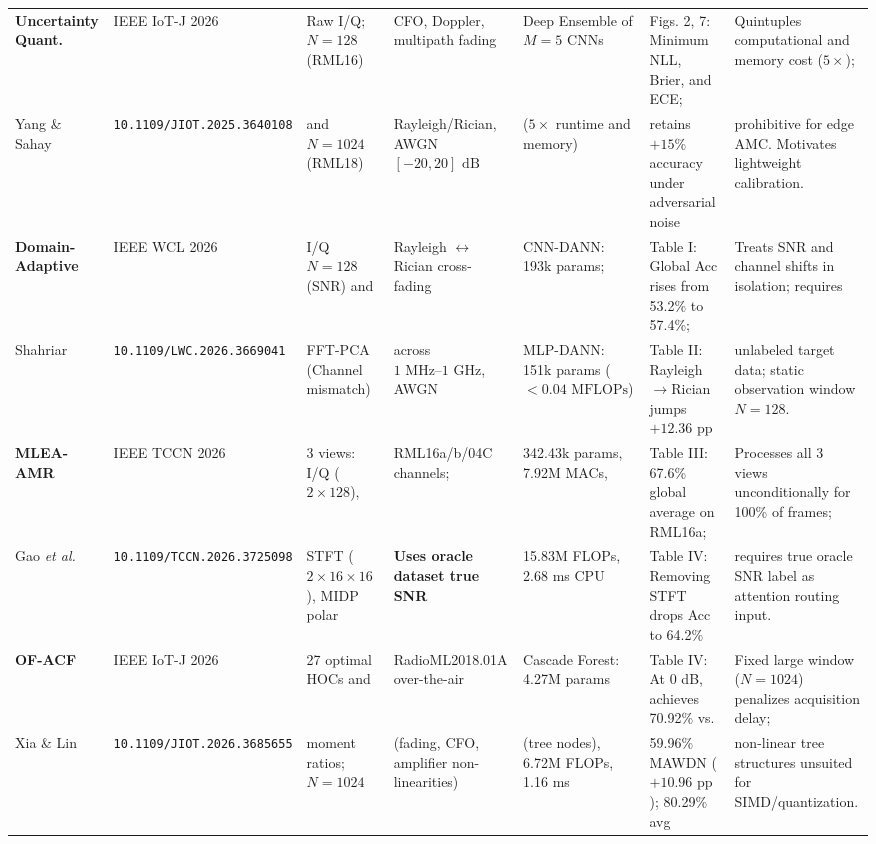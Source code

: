 \begin{table}[!t]
{\begin{tabular}{|l|l|l|l|l|l|l|}
\textbf{Uncertainty Quant.}~\cite{yang2026uncertainty} & 
IEEE IoT-J 2026 & 
Raw I/Q; $N=128$ (RML16) & 
CFO, Doppler, multipath fading & 
Deep Ensemble of $M=5$ CNNs & 
Figs. 2, 7: Minimum NLL, Brier, and ECE; & 
Quintuples computational and memory cost ($5\times$); \\
Yang \& Sahay & 
\texttt{10.1109/JIOT.2025.3640108} & 
and $N=1024$ (RML18) & 
Rayleigh/Rician, AWGN $[-20, 20]\text{ dB}$ & 
($5\times$ runtime and memory) & 
retains $+15\%$ accuracy under adversarial noise & 
prohibitive for edge AMC. Motivates lightweight calibration. \\ \hline

\textbf{Domain-Adaptive}~\cite{shahriar2026lightweight} & 
IEEE WCL 2026 & 
I/Q $N=128$ (SNR) and & 
Rayleigh $\leftrightarrow$ Rician cross-fading & 
CNN-DANN: 193k params; & 
Table I: Global Acc rises from 53.2\% to 57.4\%; & 
Treats SNR and channel shifts in isolation; requires \\
Shahriar & 
\texttt{10.1109/LWC.2026.3669041} & 
FFT-PCA (Channel mismatch) & 
across $1\text{ MHz}\text{--}1\text{ GHz}$, AWGN & 
MLP-DANN: 151k params ($<0.04\text{ MFLOPs}$) & 
Table II: Rayleigh$\to$Rician jumps $+12.36\text{ pp}$ & 
unlabeled target data; static observation window $N=128$. \\ \hline

\textbf{MLEA-AMR}~\cite{gao2026mlea} & 
IEEE TCCN 2026 & 
3 views: I/Q ($2\times 128$), & 
RML16a/b/04C channels; & 
342.43k params, 7.92M MACs, & 
Table III: 67.6\% global average on RML16a; & 
Processes all 3 views unconditionally for 100\% of frames; \\
Gao \emph{et al.} & 
\texttt{10.1109/TCCN.2026.3725098} & 
STFT ($2\times 16\times 16$), MIDP polar & 
\textbf{Uses oracle dataset true SNR} & 
15.83M FLOPs, 2.68 ms CPU & 
Table IV: Removing STFT drops Acc to 64.2\% & 
requires true oracle SNR label as attention routing input. \\ \hline

\textbf{OF-ACF}~\cite{xia2026optimal} & 
IEEE IoT-J 2026 & 
27 optimal HOCs and & 
RadioML2018.01A over-the-air & 
Cascade Forest: 4.27M params & 
Table IV: At 0 dB, achieves 70.92\% vs. & 
Fixed large window ($N=1024$) penalizes acquisition delay; \\
Xia \& Lin & 
\texttt{10.1109/JIOT.2026.3685655} & 
moment ratios; $N=1024$ & 
(fading, CFO, amplifier non-linearities) & 
(tree nodes), 6.72M FLOPs, 1.16 ms & 
59.96\% MAWDN ($+10.96\text{ pp}$); 80.29\% avg & 
non-linear tree structures unsuited for SIMD/quantization. \\ \hline


\end{tabular}}
\end{table}
